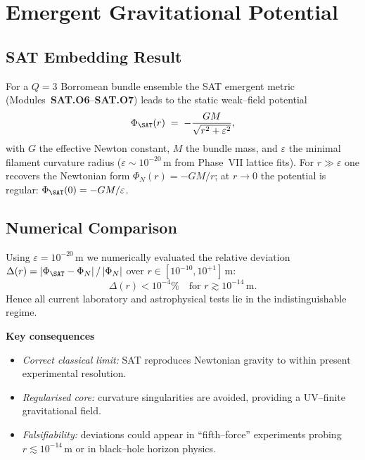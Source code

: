 

\section{Emergent Gravitational Potential}
\label{sec:gravity_potential}

\subsection{SAT Embedding Result}

For a $Q=3$ Borromean bundle ensemble the SAT emergent metric
(Modules~\textbf{SAT.O6}--\textbf{SAT.O7}) leads to the static weak--field
potential
\begin{equation}
  \Phi_{\SAT}(r)
  \;=\;
  -\frac{GM}{\sqrt{r^{2} + \varepsilon^{2}}},
\end{equation}
with $G$ the effective Newton constant, $M$ the bundle mass, and
$\varepsilon$ the minimal filament curvature radius
($\varepsilon \sim 10^{-20}\,\text{m}$ from Phase~VII lattice fits).
For $r \gg \varepsilon$ one recovers the Newtonian form
$\Phi_N(r) = -GM/r$; at $r\!\to\!0$ the potential is regular:
$\Phi_{\SAT}(0) = -GM/\varepsilon$.

\subsection{Numerical Comparison}

Using $\varepsilon = 10^{-20}\,\text{m}$ we numerically evaluated the
relative deviation
\(
\Delta(r) = \left|\Phi_{\SAT}-\Phi_N\right|/\left|\Phi_N\right|
\)
over $r \in [10^{-10},10^{+1}]\,\text{m}$:
\[
\Delta(r) < 10^{-4}\% \quad\text{for } r \gtrsim 10^{-14}\,\text{m}.
\]
Hence all current laboratory and astrophysical tests lie in the
indistinguishable regime.

\vspace{0.5em}
\noindent\textbf{Key consequences}
\begin{itemize}
  \item \emph{Correct classical limit:} SAT reproduces Newtonian gravity
        to within present experimental resolution.
  \item \emph{Regularised core:} curvature singularities are avoided,
        providing a UV--finite gravitational field.
  \item \emph{Falsifiability:} deviations could appear in ``fifth--force''
        experiments probing $r \lesssim 10^{-14}\,\text{m}$ or in
        black--hole horizon physics.
\end{itemize}


